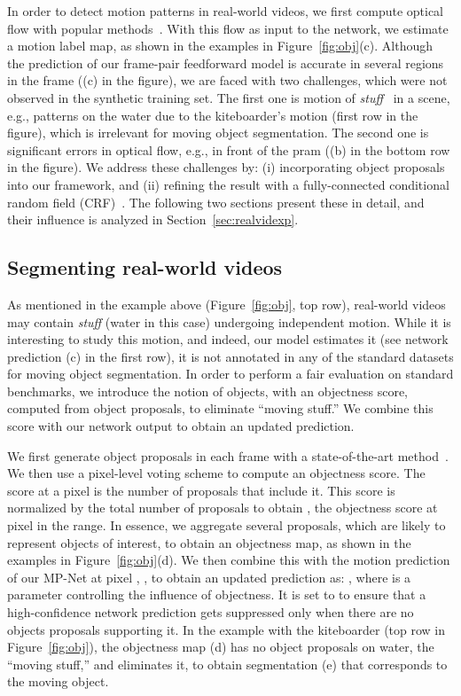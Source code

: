 \documentclass[10pt,twocolumn,letterpaper]{article}
\begin{document}
In order to detect motion patterns in real-world videos, we first compute
optical flow with popular methods~\cite{Brox11a,sundaram2010dense,Revaud15}.
With this flow as input to the network, we estimate a motion label map, as
shown in the examples in Figure~\ref{fig:obj}(c). Although the prediction of
our frame-pair feedforward model is accurate in several regions in the frame
((c) in the figure), we are faced with two challenges, which were not observed
in the synthetic training set. The first one is motion of
\textit{stuff}~\cite{Adelson01} in a scene, e.g., patterns on the water due to
the kiteboarder's motion (first row in the figure), which is irrelevant for
moving object segmentation. The second one is significant errors in optical
flow, e.g., in front of the pram ((b) in the bottom row in the figure). We
address these challenges by: (i) incorporating object
proposals~\cite{pinheiro2016learning} into our framework, and (ii) refining the
result with a fully-connected conditional random field
(CRF)~\cite{krahenbuhl2011efficient}. The following two sections present these
in detail, and their influence is analyzed in Section~\ref{sec:realvidexp}.

\vspace{-0.17cm}
\subsection{Segmenting real-world videos}
\label{sec:obj}
\vspace{-0.18cm}
As mentioned in the example above (Figure~\ref{fig:obj}, top row), real-world
videos may contain \textit{stuff} (water in this case) undergoing independent
motion. While it is interesting to study this motion, and indeed, our model
estimates it (see network prediction (c) in the first row), it is not annotated
in any of the standard datasets for moving object segmentation. In order to
perform a fair evaluation on standard benchmarks, we introduce the notion of
objects, with an objectness score, computed from object proposals, to eliminate
``moving stuff.'' We combine this score with our network output to obtain an
updated prediction.

We first generate object proposals in each frame with a state-of-the-art
method~\cite{pinheiro2016learning}. We then use a pixel-level voting scheme to
compute an objectness score. The score at a pixel  is the number of
proposals that include it. This score is normalized by the total number of
proposals to obtain , the objectness score at pixel  in the 
range. In essence, we aggregate several proposals, which are likely to
represent objects of interest, to obtain an objectness map, as shown in the
examples in Figure~\ref{fig:obj}(d). We then combine this with the motion
prediction of our MP-Net at pixel , , to obtain an updated
prediction  as: \mbox{,} where  is a parameter controlling the influence of objectness. It is set to 
to ensure that a high-confidence network prediction  gets suppressed only
when there are no objects proposals supporting it. In the example with the
kiteboarder (top row in Figure~\ref{fig:obj}), the objectness map (d) has no
object proposals on water, the ``moving stuff,'' and eliminates it, to obtain
segmentation (e) that corresponds to the moving object.
\end{document}

